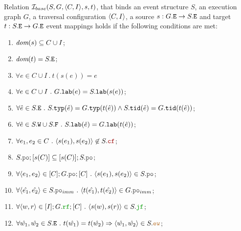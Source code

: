 \documentclass[12pt]{article}
\begin{document}
\begin{definition}
  Relation $\mathcal{I}_{base}(S, G, \langle C, I \rangle, s, t)$, that binds an 
  event structure $S$, an \imm execution graph $G$,
  a traversal configuration $\langle C, I \rangle$,
  a source $s : G.{\mathtt{E}} \rightarrow S.{\mathtt{E}}$ and target $t : S.{\mathtt{E}} \rightarrow G.{\mathtt{E}}$ event mappings
  holds if the following conditions are met:
  \begin{enumerate}[label=\textbf{S.\arabic*}]

  \item \label{item:sim-dom-s}
    $\textit{dom}{({s})} \subseteq C \cup I$;

  \item \label{item:sim-dom-t}
    $\textit{dom}{({t})} = S.{\mathtt{E}}$;

  \item \label{item:sim-ts-id}
    $\forall{e \in C \cup I} ~.~ t(s(e)) = e$

   
  \item \label{item:sim-lab}
    $\forall{e \in C \cup I} ~.~ G.{\mathtt{lab}}(e) = S.{\mathtt{lab}}(s(e))$;

  \item \label{item:sim-typ-tid}
      $\forall{\hat{e} \in S.{\mathtt{E}}} ~.~
      S.{\mathtt{typ}}(\hat{e}) = G.{\mathtt{typ}}(t(\hat{e})) \wedge
      S.{\mathtt{tid}}(\hat{e}) = G.{\mathtt{tid}}(t(\hat{e}))
      $;

  \item \label{item:sim-lab-wf}
    $\forall{\hat{e} \in S.{\mathtt{W}}\cup S.{\mathtt{F}}} ~.~ S.{\mathtt{lab}}(\hat{e}) = G.{\mathtt{lab}}(t(\hat{e}))$;

  \item \label{item:sim-cf}
    $\forall{e_1, e_2 \in C} ~.~ \tup{s(e_1), s(e_2)} \not\in S.\lCF$;

  \item \label{item:sim-po-prfx} 
    $S.\lPO;[s(\lC)] \subseteq [s(C)];S.\lPO$;

  \item \label{item:sim-po}
    $\forall{\tup{e_1, e_2} \in [C];G.\lPO;[C]} ~.~ \tup{s(e_1), s(e_2)} \in S.\lPO$;

  \item \label{item:sim-po-imm}
    $\forall{\tup{\hat{e_1}, \hat{e_2}} \in S.\lPO_{imm}} ~.~
     \tup{t(\hat{e_1}), t(\hat{e_2})} \in G.\lPO_{imm}$;

  \item \label{item:sim-rf} 
    $\forall{\tup{w, r} \in [I];G.\lRF;[C]} ~.~ \tup{s(w), s(r)} \in S.\lJF$;

  \item \label{item:sim-ew} 
    $\forall{\hat{w_1}, \hat{w_2} \in S.\lE} ~.~
      t(\hat{w_1}) = t(\hat{w_2}) \Rightarrow \tup{\hat{w_1}, \hat{w_2}} \in S.\lEW$;

  \end{enumerate}
\end{definition}
\end{document}
